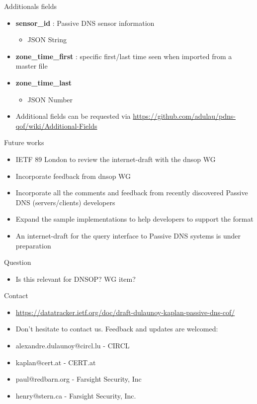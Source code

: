 \begin{frame}[t]{Additionals fields}
\begin{itemize}
\item \textbf{sensor\_id} : Passive DNS sensor information
\begin{itemize}
\item JSON String
\end{itemize}
\item \textbf{zone\_time\_first} : specific first/last time seen when imported from a master file
\item \textbf{zone\_time\_last}
\begin{itemize}
\item JSON Number
\end{itemize}
\item Additional fields can be requested via \url{https://github.com/adulau/pdns-qof/wiki/Additional-Fields}
\end{itemize}
\end{frame}


\begin{frame}[t]{Future works}
\begin{itemize}
\item IETF 89 London to review the internet-draft with the dnsop WG
\item Incorporate feedback from dnsop WG
\item Incorporate all the comments and feedback from recently discovered Passive DNS (servers/clients) developers
\item Expand the sample implementations to help developers to support the format
\item An internet-draft for the query interface to Passive DNS systems is under preparation
\end{itemize}
\end{frame}

\begin{frame}[t]{Question}
\begin{center}
\begin{itemize}
\item Is this relevant for DNSOP? WG item?
\end{itemize}
\end{center}
\end{frame}

\begin{frame}[t]{Contact}
\begin{itemize}
\item \url{https://datatracker.ietf.org/doc/draft-dulaunoy-kaplan-passive-dns-cof/}
\item Don't hesitate to contact us. Feedback and updates are welcomed:
\item alexandre.dulaunoy@circl.lu - CIRCL
\item kaplan@cert.at - CERT.at
\item paul@redbarn.org - Farsight Security, Inc
\item henry@stern.ca - Farsight Security, Inc.
\end{itemize}
\end{frame}



